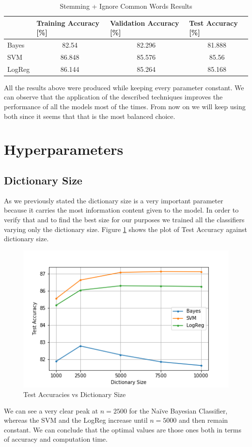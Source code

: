 \documentclass[10pt,a4paper]{report}
\begin{document}
\begin{table}[!ht]
\centering
\begin{tabular}{|l|c|c|c|}
\hline
 & \multicolumn{1}{l|}{Training Accuracy {[}\%{]}} & \multicolumn{1}{l|}{Validation Accuracy {[}\%{]}} & \multicolumn{1}{l|}{Test Accuracy {[}\%{]}} \\ \hline
Bayes  & 82.54  & 82.296 & 81.888 \\ \hline
SVM    & 86.848 & 85.576 & 85.56  \\ \hline
LogReg & 86.144 & 85.264 & 85.168 \\ \hline
\end{tabular}
\caption{Stemming + Ignore Common Words Results}
\label{tab:stemming_ignore_common}
\end{table}
All the results above were produced while keeping every parameter constant. We can observe that the application of the described techniques improves the performance of all the models most of the times. From now on we will keep using both since it seems that that is the most balanced choice.
\section{Hyperparameters}
\subsection{Dictionary Size}
As we previously stated the dictionary size is a very important parameter because it carries the most information content given to the model. In order to verify that and to find the best size for our purposes we trained all the classifiers varying only the dictionary size. Figure \ref{fig:test_acc} shows the plot of Test Accuracy against dictionary size.
\begin{figure}[!ht]
\centering
\includegraphics[width=0.6\linewidth]{test_acc.png}
\caption{Test Accuracies vs Dictionary Size}
\label{fig:test_acc}
\end{figure}
We can see a very clear peak at $n=2500$ for the Na\"{i}ve Bayesian Classifier, whereas the SVM and the LogReg increase until $n=5000$ and then remain constant. We can conclude that the optimal values are those ones both in terms of accuracy and computation time.
\end{document}
